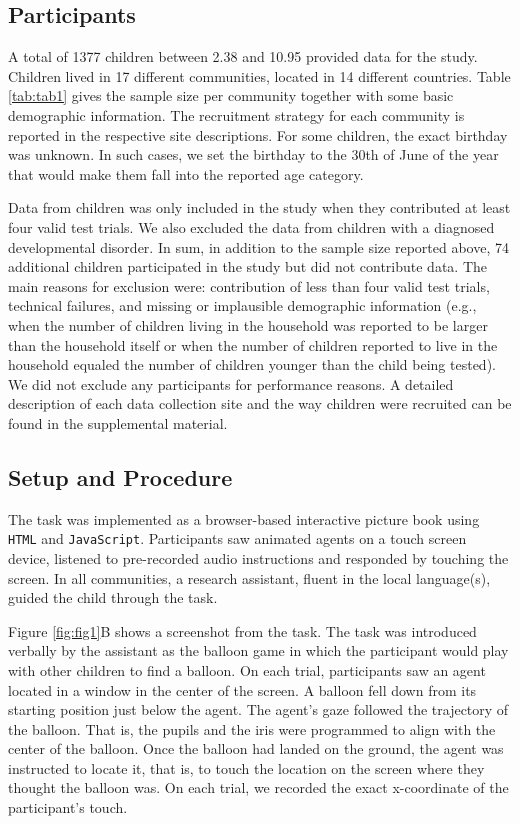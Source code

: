 \documentclass[
  man,floatsintext]{apa6}
\begin{document}
\hypertarget{participants}{%
\subsection{Participants}\label{participants}}

A total of 1377 children between 2.38 and 10.95 provided data for the study. Children lived in 17 different communities, located in 14 different countries. Table \ref{tab:tab1} gives the sample size per community together with some basic demographic information. The recruitment strategy for each community is reported in the respective site descriptions. For some children, the exact birthday was unknown. In such cases, we set the birthday to the 30th of June of the year that would make them fall into the reported age category.

Data from children was only included in the study when they contributed at least four valid test trials. We also excluded the data from children with a diagnosed developmental disorder. In sum, in addition to the sample size reported above, 74 additional children participated in the study but did not contribute data. The main reasons for exclusion were: contribution of less than four valid test trials, technical failures, and missing or implausible demographic information (e.g., when the number of children living in the household was reported to be larger than the household itself or when the number of children reported to live in the household equaled the number of children younger than the child being tested). We did not exclude any participants for performance reasons. A detailed description of each data collection site and the way children were recruited can be found in the supplemental material.

\hypertarget{setup-and-procedure}{%
\subsection{Setup and Procedure}\label{setup-and-procedure}}

The task was implemented as a browser-based interactive picture book using \texttt{HTML} and \texttt{JavaScript}. Participants saw animated agents on a touch screen device, listened to pre-recorded audio instructions and responded by touching the screen. In all communities, a research assistant, fluent in the local language(s), guided the child through the task.

Figure \ref{fig:fig1}B shows a screenshot from the task. The task was introduced verbally by the assistant as the balloon game in which the participant would play with other children to find a balloon. On each trial, participants saw an agent located in a window in the center of the screen. A balloon fell down from its starting position just below the agent. The agent's gaze followed the trajectory of the balloon. That is, the pupils and the iris were programmed to align with the center of the balloon. Once the balloon had landed on the ground, the agent was instructed to locate it, that is, to touch the location on the screen where they thought the balloon was. On each trial, we recorded the exact x-coordinate of the participant's touch.
\end{document}
